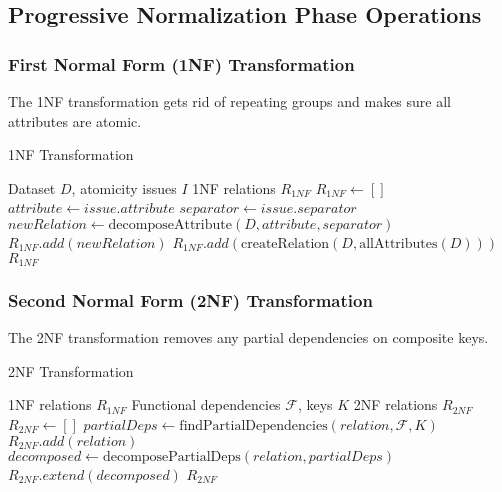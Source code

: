 \documentclass[sigconf]{acmart}
\begin{document}
\subsection{Progressive Normalization Phase Operations}

\subsubsection{First Normal Form (1NF) Transformation}

The 1NF transformation gets rid of repeating groups and makes sure all attributes are atomic.

\begin{algorithm}
\caption{1NF Transformation}
\label{alg:1nf-transform}
\begin{algorithmic}[1]
\REQUIRE Dataset $D$, atomicity issues $I$
\ENSURE 1NF relations $R_{1NF}$
\STATE $R_{1NF} \leftarrow []$
    \STATE $attribute \leftarrow issue.attribute$
    \STATE $separator \leftarrow issue.separator$
    \STATE $newRelation \leftarrow 
    \text{decomposeAttribute}(D, attribute, separator)$
    \STATE $R_{1NF}.add(newRelation)$
\ENDFOR
{} 
    \STATE $R_{1NF}.add(\text{createRelation}(D, \text{allAttributes}(D)))$
\ENDIF
\STATE \RETURN $R_{1NF}$
\end{algorithmic}
\end{algorithm}

\subsubsection{Second Normal Form (2NF) Transformation}

The 2NF transformation removes any partial dependencies on composite keys.

\begin{algorithm}
\caption{2NF Transformation}
\label{alg:2nf-transform}
\begin{algorithmic}[1]
\REQUIRE 1NF relations $R_{1NF}$
\REQUIRE Functional dependencies $\mathcal{F}$, keys $K$
\ENSURE 2NF relations $R_{2NF}$
\STATE $R_{2NF} \leftarrow []$
    \STATE $partialDeps \leftarrow 
    \text{findPartialDependencies}(relation, \mathcal{F}, K)$
        \STATE $R_{2NF}.add(relation)$ 
    \ELSE
        \STATE $decomposed \leftarrow 
        \text{decomposePartialDeps}(relation, partialDeps)$
        \STATE $R_{2NF}.extend(decomposed)$
    \ENDIF
\ENDFOR
\STATE \RETURN $R_{2NF}$
\end{algorithmic}
\end{algorithm}
\end{document}
